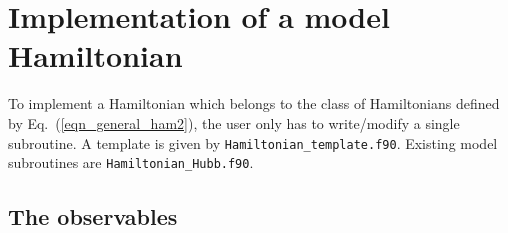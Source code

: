 \section{Implementation of a model Hamiltonian} 
To implement a Hamiltonian which belongs to the class of Hamiltonians defined by Eq.~(\ref{eqn_general_ham2}), 
the user only has to write/modify a single subroutine. A template is given by \texttt{Hamiltonian\_template.f90}. 
Existing model subroutines are \texttt{Hamiltonian\_Hubb.f90}.


\subsection{The observables}
